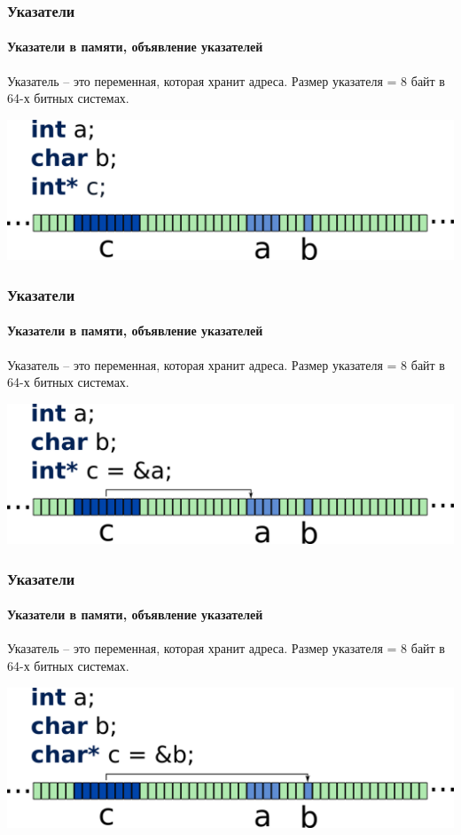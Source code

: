 \documentclass[12pt,pdf,hyperref={unicode}]{beamer}
\begin{document}
\begin{frame}[fragile]
\frametitle{Указатели} 
\framesubtitle{Указатели в памяти, объявление указателей}
Указатель -- это переменная, которая хранит адреса. 
Размер указателя = 8 байт в 64-х битных системах.
\begin{center}
\includegraphics[width=0.95\linewidth]{images/memory_pointer_1.png}
\end{center}
\end{frame}

\begin{frame}[fragile]
\frametitle{Указатели} 
\framesubtitle{Указатели в памяти, объявление указателей}
Указатель -- это переменная, которая хранит адреса. 
Размер указателя = 8 байт в 64-х битных системах.
\begin{center}
\includegraphics[width=0.95\linewidth]{images/memory_pointer_2.png}
\end{center}
\end{frame}

\begin{frame}[fragile]
\frametitle{Указатели} 
\framesubtitle{Указатели в памяти, объявление указателей}
Указатель -- это переменная, которая хранит адреса. 
Размер указателя = 8 байт в 64-х битных системах.
\begin{center}
\includegraphics[width=0.95\linewidth]{images/memory_pointer_3.png}
\end{center}
\end{frame}
\end{document}
